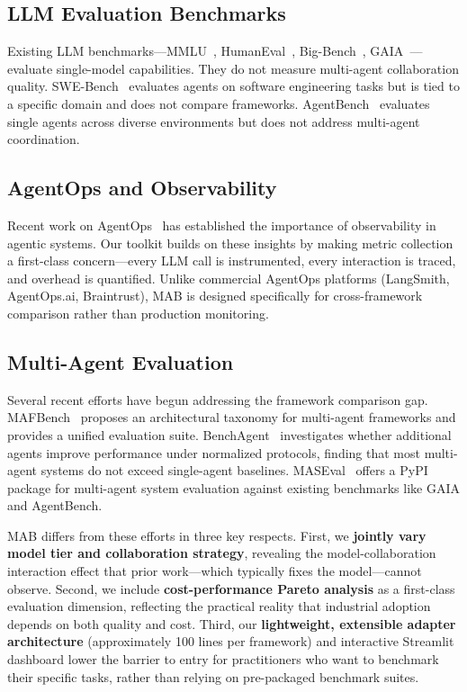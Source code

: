 \documentclass[sigconf,nonacm]{acmart}
\begin{document}
\subsection{LLM Evaluation Benchmarks}

Existing LLM benchmarks—MMLU~\cite{hendrycks2021mmlu}, HumanEval~\cite{chen2021humaneval}, Big-Bench~\cite{srivastava2023bigbench}, GAIA~\cite{mialon2023gaia}—evaluate single-model capabilities. They do not measure multi-agent collaboration quality. SWE-Bench~\cite{jimenez2024swebench} evaluates agents on software engineering tasks but is tied to a specific domain and does not compare frameworks. AgentBench~\cite{liu2024agentbench} evaluates single agents across diverse environments but does not address multi-agent coordination.

\subsection{AgentOps and Observability}

Recent work on AgentOps~\cite{moshkovich2025taming,dong2025taxonomy} has established the importance of observability in agentic systems. Our toolkit builds on these insights by making metric collection a first-class concern—every LLM call is instrumented, every interaction is traced, and overhead is quantified. Unlike commercial AgentOps platforms (LangSmith, AgentOps.ai, Braintrust), MAB is designed specifically for cross-framework comparison rather than production monitoring.

\subsection{Multi-Agent Evaluation}

Several recent efforts have begun addressing the framework comparison gap. MAFBench~\cite{mafbench2026} proposes an architectural taxonomy for multi-agent frameworks and provides a unified evaluation suite. BenchAgent~\cite{benchagent2026} investigates whether additional agents improve performance under normalized protocols, finding that most multi-agent systems do not exceed single-agent baselines. MASEval~\cite{maseval2026} offers a PyPI package for multi-agent system evaluation against existing benchmarks like GAIA and AgentBench.

MAB differs from these efforts in three key respects. First, we \textbf{jointly vary model tier and collaboration strategy}, revealing the model-collaboration interaction effect that prior work—which typically fixes the model—cannot observe. Second, we include \textbf{cost-performance Pareto analysis} as a first-class evaluation dimension, reflecting the practical reality that industrial adoption depends on both quality and cost. Third, our \textbf{lightweight, extensible adapter architecture} (approximately 100 lines per framework) and interactive Streamlit dashboard lower the barrier to entry for practitioners who want to benchmark their specific tasks, rather than relying on pre-packaged benchmark suites.
\end{document}

